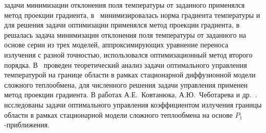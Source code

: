     задачи минимизации отклонения поля температуры от заданного применялся
    метод проекции градиента, в~\cite{clever2012optimal, Pinnau2004} минимизировалась норма градиента
    температуры и для решения задачи оптимизации применялся метод проекции
    градиента, в~\cite{clever2014model} решалась задача минимизации отклонения поля
    температуры от заданного на основе серии из трех моделей,
    аппроксимирующих уравнение переноса излучения с разной точностью,
    использовался оптимизационный метод второго порядка.
    В~\cite{Pinnau2004} проведен
    теоретический анализ задачи оптимального управления температурой на
    границе области в рамках стационарной диффузионной модели сложного
    теплообмена, для численного решения задачи управления применен метод
    проекции градиента.
    В работах А.Е.\ Ковтанюка, А.Ю.\ Чеботарева и др.\ \cite{Kovtanyuk2014,
        Mesenev2018, astrakhantseva2017design, Chebotarev2015,
        Kovtanyuk2014TheoreticalAnalysis, Chebotarev23nonhomogeneus, Chebotarev23optimal}.
    исследованы задачи оптимального
    управления коэффициентом излучения границы области в рамках
    стационарной модели сложного теплообмена на основе $P_1$-приближения.


